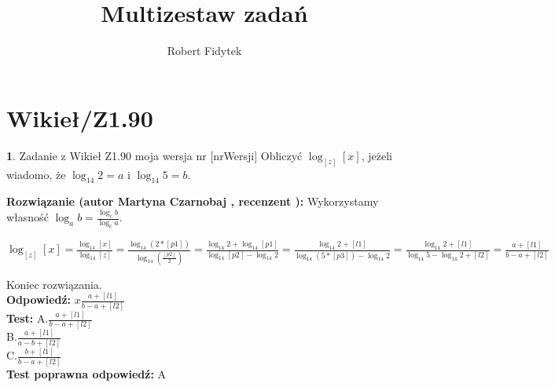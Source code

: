 \documentclass[12pt, a4paper]{article}
\title{Multizestaw zadań}
\author{Robert Fidytek}
\date{}
\theoremstyle{definition} %
\newtheorem{zad}{}
\newcommand{\kategoria}[1]{\section{#1}} %
\newcommand{\zadStart}[1]{\begin{zad}#1\newline} %
\newcommand{\zadStop}{\end{zad}}   %
\newcommand{\rozwStart}[2]{\noindent \textbf{Rozwiązanie (autor #1 , recenzent #2): }\newline} %
\newcommand{\rozwStop}{\newline}                                            %
\newcommand{\odpStart}{\noindent \textbf{Odpowiedź:}\newline}    %
\newcommand{\odpStop}{\newline}                                             %
\newcommand{\testStart}{\noindent \textbf{Test:}\newline} %
\newcommand{\testStop}{\newline} %
\newcommand{\kluczStart}{\noindent \textbf{Test poprawna odpowiedź:}\newline} %
\newcommand{\kluczStop}{\newline} %
\begin{document}
\maketitle


\kategoria{Wikieł/Z1.90}
\zadStart{Zadanie z Wikieł Z1.90 moja wersja nr [nrWersji]}
Obliczyć $ \log_{[z]} [x] $, jeżeli wiadomo, że $ \log_{14} 2 = a $ i $ \log_{14} 5 = b $.\\
\zadStop
\rozwStart{Martyna Czarnobaj}{}
Wykorzystamy własność $ \log_a b = \frac{\log_c b}{\log_c a} $.\\
\begin{center}
	$ \log_{[z]} [x] = \frac{\log_{14} [x]}{\log_{14} [z]} = \frac{\log_{14} (2*[p1])}{\log_{14} (\frac{[p2]}{2})} = \frac{\log_{14} 2 + \log_{14} [p1]}{\log_{14} [p2] - \log_{14} 2} = \frac{\log_{14} 2 + [l1] }{\log_{14} (5*[p3]) - \log_{14} 2} = \frac{\log_{14} 2 + [l1] }{\log_{14} 5 - \log_{14} 2 + [l2]} = \frac{a + [l1]}{b - a + [l2]} $\\
\end{center}

Koniec rozwiązania.\\
\rozwStop
\odpStart
$ x \frac{a + [l1]}{b - a + [l2]} $\\
\odpStop
\testStart
A.$ \frac{a + [l1]}{b - a + [l2]} $\\
B.$ \frac{a + [l1]}{a - b + [l2]} $\\
C.$ \frac{b + [l1]}{b - a + [l2]} $\\
\testStop
\kluczStart
A
\kluczStop
\end{document}
